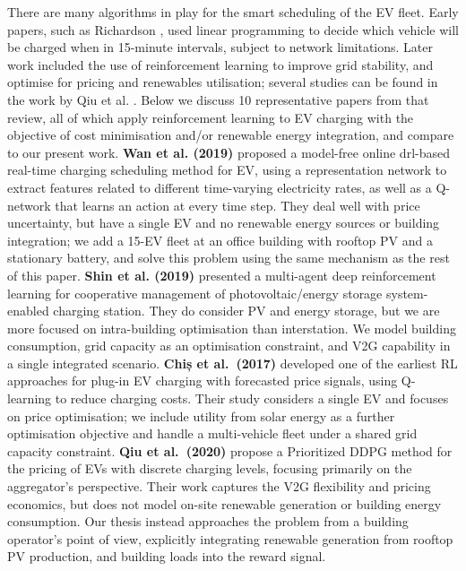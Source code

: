There are many algorithms in play for the smart scheduling of the EV fleet. Early papers, such as Richardson \cite{richardson2012ev_ucd}, used linear programming to decide which vehicle will be charged when in 15-minute intervals, subject to network limitations. Later work included the use of reinforcement learning to improve grid stability, and optimise for pricing and renewables utilisation; several studies can be found in the work by Qiu et al. \cite{qiu2023rl_ev_review}. Below we discuss 10 representative papers from that review, all of which apply reinforcement learning to EV charging with the objective of cost minimisation and/or renewable energy integration, and compare to our present work.
\textbf{Wan et al. (2019)} \cite{wan2019drl_ev} proposed a model-free online drl-based real-time charging scheduling method for EV, using a representation network to extract features related to different time-varying electricity rates, as well as a Q-network that learns an action at every time step. They deal well with price uncertainty, but have a single EV and no renewable energy sources or building integration; we add a 15-EV fleet at an office building with rooftop PV and a stationary battery, and solve this problem using the same mechanism as the rest of this paper.
\textbf{Shin et al. (2019)} \cite{shin2019cooperative} presented a multi-agent deep reinforcement learning for cooperative management of photovoltaic/energy storage system-enabled charging station. They do consider PV and energy storage, but we are more focused on intra-building optimisation than interstation. We model building consumption, grid capacity as an optimisation constraint, and V2G capability in a single integrated scenario.
\textbf{Chiș et al.\ (2017)} \cite{chis2017rl_ev_price} developed one of the earliest RL approaches for plug-in EV charging with forecasted price signals, using Q-learning to reduce charging costs. Their study considers a single EV and focuses on price optimisation; we include utility from solar energy as a further optimisation objective and handle a multi-vehicle fleet under a shared grid capacity constraint.
\textbf{Qiu et al.\ (2020)} \cite{qiu2020drl_pricing_ev} propose a Prioritized DDPG method for the pricing of EVs with discrete charging levels, focusing primarily on the aggregator's perspective. Their work captures the V2G flexibility and pricing economics, but does not model on-site renewable generation or building energy consumption. Our thesis instead approaches the problem from a building operator's point of view, explicitly integrating renewable generation from rooftop PV production, and building loads into the reward signal.
